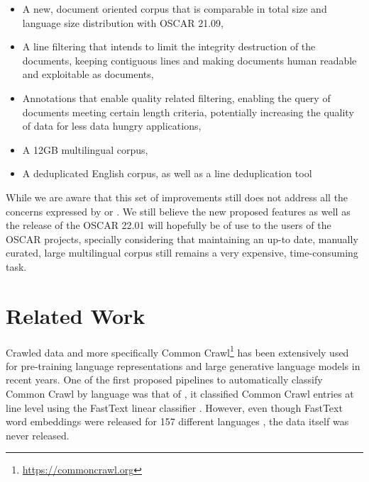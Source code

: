 \begin{itemize}
    \item A new, document oriented corpus that is comparable in total size and language size distribution with OSCAR 21.09,
    \item A line filtering that intends to limit the integrity destruction of the documents, keeping contiguous lines and making documents human readable and exploitable as documents,
    \item Annotations that enable quality related filtering, enabling the query of documents meeting certain length criteria, potentially increasing the quality of data for less data hungry applications,
    \item A 12GB multilingual corpus,
    \item A deduplicated English corpus, as well as a line deduplication tool
\end{itemize}

While we are aware that this set of improvements still does not address all the concerns expressed by  or . We still believe the new proposed features as well as the release of the OSCAR 22.01 will hopefully be of use to the users of the OSCAR projects, specially considering that maintaining an up-to date, manually curated, large multilingual corpus still remains a very expensive, time-consuming task.

\section{Related Work}

Crawled data and more specifically Common Crawl\footnote{\url{https://commoncrawl.org}} has been extensively used for pre-training language representations and large generative language models in recent years. One of the first proposed pipelines to automatically classify Common Crawl by language was that of , it classified Common Crawl entries at line level using the FastText linear classifier \cite{joulin-etal-2016-fasttext,joulin-etal-2017-bag}. However, even though FastText word embeddings were released for 157 different languages \cite{grave-etal-2018-learning}, the data itself was never released.

